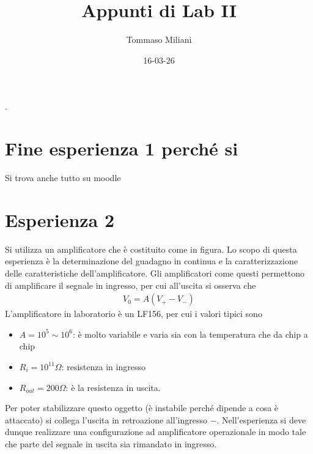 \documentclass[a4paper, oneside]{article}
\title{Appunti di Lab II}
\author{Tommaso Miliani}
\date{16-03-26}
\begin{document}
                {}          %
                {}          %
                {\slshape}  %
                {}          %
                {\bfseries} %
                {.}         %
                {\newline}  %
                {}          %
\theoremstyle{theoremEnv}

\newtheorem{definition}{Definizione}[section]
\newtheorem{theorem}{Teorema}[section]
\newtheorem{lemma}{Proposizione}[section]
\newtheorem{observation}{Osservazione}[section]
\newtheorem{corollary}{Corollario}[theorem]
\newtheorem{example}{Esempio}[section]
\newtheorem{remark}{Enunciato}[section]

\maketitle

\section{Fine esperienza 1 perché si}
Si trova anche tutto su moodle 


\section{Esperienza 2}
Si utilizza un amplificatore che è costituito come in figura.
Lo scopo di questa esperienza è la determinazione del guadagno 
in continua e la caratterizzazione delle caratteristiche dell'amplificatore. 
Gli amplificatori come questi permettono di amplificare il segnale in 
ingresso, per cui all'uscita si osserva che
\begin{gather*}
    V_0 = A(V_+ - V_-)
\end{gather*}
L'amplificatore in laboratorio è un LF156, per cui i valori tipici sono 
\begin{itemize}
    \item $A = 10^{5}\sim 10^{6}$: è molto variabile e varia sia con
    la temperatura che da chip a chip
    \item $R_i = 10^{11} \Omega$: resistenza in ingresso
    \item $R_{out} = 200\Omega$: è la resistenza in uscita. 
\end{itemize}
Per poter stabilizzare questo oggetto (è instabile perché dipende a cosa è 
attaccato) si collega l'uscita in retroazione all'ingresso $-$. Nell'esperienza
si deve dunque realizzare una configurazione ad amplificatore operazionale in modo 
tale che parte del segnale in uscita sia rimandato in ingresso.
\end{document}

